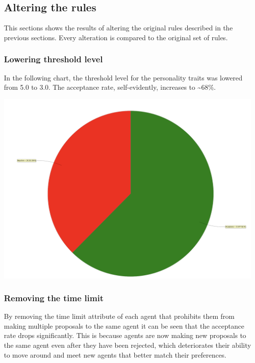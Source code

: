 \documentclass[a4paper,10pt]{article}
\begin{document}
\subsection{Altering the rules}
This sections shows the results of altering the original rules described in the previous sections. Every alteration is compared to the original set of rules.

\subsubsection{Lowering threshold level}
In the following chart, the threshold level for the personality traits was lowered from 5.0 to 3.0. The acceptance rate, self-evidently, increases to \textasciitilde 68\%.

\begin{center}{}
\centering\includegraphics[scale=0.05]{lowerthreshold.png}\par
\end{center}

\subsubsection{Removing the time limit}
By removing the time limit attribute of each agent that prohibits them from making multiple proposals to the same agent it can be seen that the acceptance rate drops significantly. This is because agents are now making new proposals to the same agent even after they have been rejected, which deteriorates their ability to move around and meet new agents that better match their preferences.
\end{document}
